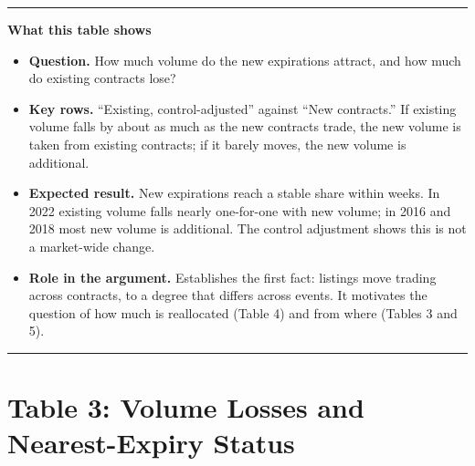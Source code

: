 \documentclass[11pt]{article}
\newenvironment{tableshows}
  {\begin{center}\begin{minipage}{0.95\textwidth}\small
   \hrule\vspace{4pt}
   \textbf{What this table shows}\par
   \begin{itemize}[leftmargin=12pt,topsep=4pt,itemsep=4pt,parsep=0pt]}
  {\end{itemize}\vspace{2pt}\hrule\end{minipage}\end{center}}
\begin{document}
\begin{table}[H]
\begin{threeparttable}
\begin{tablenotes}
\end{tablenotes}
\end{threeparttable}
\end{table}

\begin{tableshows}
\item \textbf{Question.} How much volume do the new expirations attract, and how much do existing contracts lose?
\item \textbf{Key rows.} ``Existing, control-adjusted'' against ``New contracts.'' If existing volume falls by about as much as the new contracts trade, the new volume is taken from existing contracts; if it barely moves, the new volume is additional.
\item \textbf{Expected result.} New expirations reach a stable share within weeks. In 2022 existing volume falls nearly one-for-one with new volume; in 2016 and 2018 most new volume is additional. The control adjustment shows this is not a market-wide change.
\item \textbf{Role in the argument.} Establishes the first fact: listings move trading across contracts, to a degree that differs across events. It motivates the question of how much is reallocated (Table 4) and from where (Tables 3 and 5).
\end{tableshows}

\clearpage
\section*{Table 3: Volume Losses and Nearest-Expiry Status}
\end{document}
